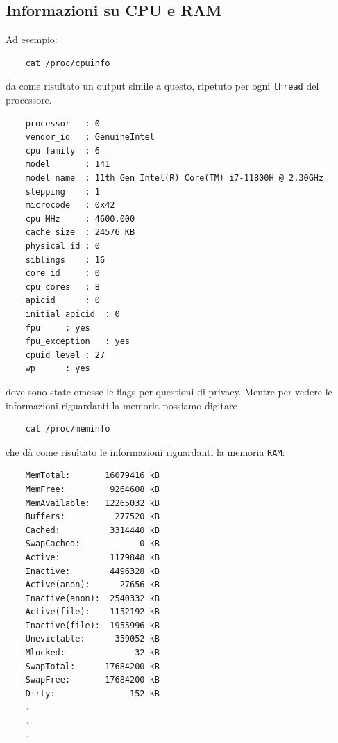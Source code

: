 \documentclass[11pt]{book}
\begin{document}
\subsection{Informazioni su CPU e RAM}
 Ad esempio:
\begin{verbatim}
	cat /proc/cpuinfo
\end{verbatim}
da come risultato un output simile a questo, ripetuto per ogni \verb*|thread| del processore. 
\begin{verbatim}
	processor	: 0
	vendor_id	: GenuineIntel
	cpu family	: 6
	model		: 141
	model name	: 11th Gen Intel(R) Core(TM) i7-11800H @ 2.30GHz
	stepping	: 1
	microcode	: 0x42
	cpu MHz		: 4600.000
	cache size	: 24576 KB
	physical id	: 0
	siblings	: 16
	core id		: 0
	cpu cores	: 8
	apicid		: 0
	initial apicid	: 0
	fpu		: yes
	fpu_exception	: yes
	cpuid level	: 27
	wp		: yes
\end{verbatim}
dove sono state omesse le flags per questioni di privacy. Mentre per vedere le informazioni riguardanti la memoria possiamo digitare
\begin{verbatim}
	cat /proc/meminfo
\end{verbatim}
che dà come risultato le informazioni riguardanti la memoria \verb*|RAM|:
\begin{verbatim}
	MemTotal:       16079416 kB
	MemFree:         9264608 kB
	MemAvailable:   12265032 kB
	Buffers:          277520 kB
	Cached:          3314440 kB
	SwapCached:            0 kB
	Active:          1179848 kB
	Inactive:        4496328 kB
	Active(anon):      27656 kB
	Inactive(anon):  2540332 kB
	Active(file):    1152192 kB
	Inactive(file):  1955996 kB
	Unevictable:      359052 kB
	Mlocked:              32 kB
	SwapTotal:      17684200 kB
	SwapFree:       17684200 kB
	Dirty:               152 kB
	.
	.
	.
\end{verbatim}
\end{document}
